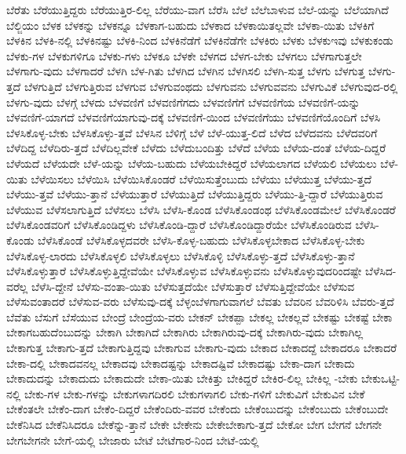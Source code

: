 {ಬೆರೆತು
ಬೆರೆಯುತ್ತಿದ್ದರು
ಬೆರೆಯುತ್ತಿರ-ಲಿಲ್ಲ
ಬೆರೆಯು-ವಾಗ
ಬೆರೆಸಿ
ಬೆಲೆ
ಬೆಲೆಬಾಳುವ
ಬೆಲೆ-ಯನ್ನು
ಬೆಲೆಯಾಗಿದೆ
ಬೆಲ್ಜಿಯಂ
ಬೆಳಕ
ಬೆಳಕನ್ನು
ಬೆಳಕನ್ನೂ
ಬೆಳಕಾಗ-ಬಹುದು
ಬೆಳಕಾದ
ಬೆಳಕಾಯಿತಲ್ಲವೇ
ಬೆಳಕಾ-ಯಿತು
ಬೆಳಕಿಗೆ
ಬೆಳಕಿನ
ಬೆಳಕಿ-ನಲ್ಲಿ
ಬೆಳಕಿನಷ್ಟು
ಬೆಳಕಿ-ನಿಂದ
ಬೆಳಕಿನೆಡೆಗೆ
ಬೆಳಕಿನೆಡೆಗೇ
ಬೆಳಕಿರು
ಬೆಳಕು
ಬೆಳಕುಇವು
ಬೆಳಕುಕಂಡು
ಬೆಳಕು-ಗಳ
ಬೆಳಕುಗಳಿಗೂ
ಬೆಳಕು-ಗಳು
ಬೆಳಕೂ
ಬೆಳಕೇ
ಬೆಳಗದ
ಬೆಳಗ-ಬೇಕು
ಬೆಳಗಲು
ಬೆಳಗಾಗುತ್ತಲೇ
ಬೆಳಗಾಗು-ವುದು
ಬೆಳಗಾದರೆ
ಬೆಳಗಿ
ಬೆಳ-ಗಿತು
ಬೆಳಗಿದ
ಬೆಳಗಿನ
ಬೆಳಗಿಸಲಿ
ಬೆಳಗಿ-ಸುತ್ತ
ಬೆಳಗು
ಬೆಳಗುತ್ತ
ಬೆಳಗು-ತ್ತದೆ
ಬೆಳಗುತ್ತಿದೆ
ಬೆಳಗುತ್ತಿರುವ
ಬೆಳಗುವ
ಬೆಳಗುವಂಥದು
ಬೆಳಗುವನು
ಬೆಳಗುವವನು
ಬೆಳಗುವಿಕೆ
ಬೆಳಗುವುದ-ರಲ್ಲಿ
ಬೆಳಗು-ವುದು
ಬೆಳಗ್ಗೆ
ಬೆಳದು
ಬೆಳವಣಿಗೆ
ಬೆಳವಣಿಗೆಗದು
ಬೆಳವಣಿಗೆಗೆ
ಬೆಳವಣಿಗೆಯ
ಬೆಳವಣಿಗೆ-ಯನ್ನು
ಬೆಳವಣಿಗೆ-ಯಾಗದೆ
ಬೆಳವಣಿಗೆಯಾಗುವು-ದಕ್ಕೆ
ಬೆಳವಣಿಗೆ-ಯಿಂದ
ಬೆಳವಣಿಗೆಯು
ಬೆಳವಣಿಗೆಯೊಂದಿಗೆ
ಬೆಳಸಿ
ಬೆಳಸಿಕೊಳ್ಳ-ಬೇಕು
ಬೆಳಸಿಕೊಳ್ಳು-ತ್ತವೆ
ಬೆಳಸಿನ
ಬೆಳಿಗ್ಗೆ
ಬೆಳೆ
ಬೆಳೆ-ಯುತ್ತ-ಲಿದೆ
ಬೆಳೆದ
ಬೆಳೆದವನು
ಬೆಳೆದವರಿಗೆ
ಬೆಳೆದಿದ್ದ
ಬೆಳೆದಿರು-ತ್ತದೆ
ಬೆಳೆದಿಲ್ಲವೇಕೆ
ಬೆಳೆದು
ಬೆಳೆದುಬಂದಿತ್ತು
ಬೆಳೆದೆ
ಬೆಳೆಯ
ಬೆಳೆಯ-ದಂತೆ
ಬೆಳೆಯ-ದಿದ್ದರೆ
ಬೆಳೆಯದೆ
ಬೆಳೆಯದೇ
ಬೆಳೆ-ಯನ್ನು
ಬೆಳೆಯ-ಬಹುದು
ಬೆಳೆಯಬೇಕಿದ್ದರೆ
ಬೆಳೆಯಲಾಗದ
ಬೆಳೆಯಲಿ
ಬೆಳೆಯಲು
ಬೆಳೆ-ಯಿತು
ಬೆಳೆಯಿಸಲು
ಬೆಳೆಯಿಸಿ
ಬೆಳೆಯಿಸಿಕೊಂಡರೆ
ಬೆಳೆಯಿಸುತ್ತೆಂಬುದು
ಬೆಳೆಯು
ಬೆಳೆಯುತ್ತ
ಬೆಳೆಯು-ತ್ತದೆ
ಬೆಳೆಯು-ತ್ತವೆ
ಬೆಳೆಯು-ತ್ತಾನೆ
ಬೆಳೆಯುತ್ತಾರೆ
ಬೆಳೆಯುತ್ತಿದೆ
ಬೆಳೆಯುತ್ತಿದ್ದರು
ಬೆಳೆಯು-ತ್ತಿ-ದ್ದಾರೆ
ಬೆಳೆಯುತ್ತಿರುವ
ಬೆಳೆಯುವ
ಬೆಳೆಸಲಾಗುತ್ತಿದೆ
ಬೆಳೆಸಲು
ಬೆಳೆಸಿ
ಬೆಳೆಸಿ-ಕೊಂಡ
ಬೆಳೆಸಿಕೊಂಡಂಥ
ಬೆಳೆಸಿಕೊಂಡಮೇಲೆ
ಬೆಳೆಸಿಕೊಂಡರೆ
ಬೆಳೆಸಿಕೊಂಡವರಿಗೆ
ಬೆಳೆಸಿಕೊಂಡಿದ್ದಳು
ಬೆಳೆಸಿಕೊಂಡಿ-ದ್ದಾರೆ
ಬೆಳೆಸಿಕೊಂಡಿದ್ದಾರೆಯೇ
ಬೆಳೆಸಿಕೊಂಡಿರುವ
ಬೆಳೆಸಿ-ಕೊಂಡು
ಬೆಳೆಸಿಕೊಂಡೆ
ಬೆಳೆಸಿಕೊಳ್ಳದವರೇ
ಬೆಳೆಸಿ-ಕೊಳ್ಳ-ಬಹುದು
ಬೆಳೆಸಿಕೊಳ್ಳಬೇಕಾದ
ಬೆಳೆಸಿಕೊಳ್ಳ-ಬೇಕು
ಬೆಳೆಸಿಕೊಳ್ಳ-ಲಾರದು
ಬೆಳೆಸಿಕೊಳ್ಳಲಿ
ಬೆಳೆಸಿಕೊಳ್ಳಲು
ಬೆಳೆಸಿಕೊಳ್ಳಿ
ಬೆಳೆಸಿಕೊಳ್ಳು-ತ್ತದೆ
ಬೆಳೆಸಿಕೊಳ್ಳು-ತ್ತಾನೆ
ಬೆಳೆಸಿಕೊಳ್ಳುತ್ತಾರೆ
ಬೆಳೆಸಿಕೊಳ್ಳುತ್ತಿದ್ದೇವೆಯೇ
ಬೆಳೆಸಿಕೊಳ್ಳುವ
ಬೆಳೆಸಿಕೊಳ್ಳುವನು
ಬೆಳೆಸಿಕೊಳ್ಳುವುದರಿಂದಷ್ಟೇ
ಬೆಳೆಸಿದ-ವರೆಲ್ಲ
ಬೆಳೆಸಿ-ದ್ದೇನೆ
ಬೆಳೆಸು-ವಂತಾ-ಯಿತು
ಬೆಳೆಸುತ್ತದೆಯೇ
ಬೆಳೆಸುತ್ತಾರೆ
ಬೆಳೆಸುತ್ತಿದ್ದೇವೆಯೇ
ಬೆಳೆಸುವ
ಬೆಳೆಸುವಂತಾದರೆ
ಬೆಳೆಸುವ-ವರು
ಬೆಳೆಸುವು-ದಕ್ಕೆ
ಬೆಳ್ಳಂಬೆಳಗಾಗುವಾಗಲೆ
ಬೆವತು
ಬೆವರಿನ
ಬೆವರಿಳಿಸಿ
ಬೆವರು-ತ್ತದೆ
ಬೆವೆತು
ಬೆಸುಗೆ
ಬೆಸೆಯುವ
ಬೇಂದ್ರೆ
ಬೇಂದ್ರೆಯ-ವರು
ಬೇಕನ್
ಬೇಕಪ್ಪಾ
ಬೇಕಲ್ಲ
ಬೇಕಲ್ಲವೆ
ಬೇಕಷ್ಟು
ಬೇಕಷ್ಟೆ
ಬೇಕಾ
ಬೇಕಾಗಬಹುದೆಂಬುದನ್ನು
ಬೇಕಾಗಿ
ಬೇಕಾಗಿದೆ
ಬೇಕಾಗಿರು
ಬೇಕಾಗಿರುವು-ದಕ್ಕೆ
ಬೇಕಾಗಿರು-ವುದು
ಬೇಕಾಗಿಲ್ಲ
ಬೇಕಾಗುತ್ತ
ಬೇಕಾಗು-ತ್ತದೆ
ಬೇಕಾಗುತ್ತಿದ್ದವು
ಬೇಕಾಗುವ
ಬೇಕಾಗು-ವುದು
ಬೇಕಾದ
ಬೇಕಾದದ್ದೆ
ಬೇಕಾದರೂ
ಬೇಕಾದರೆ
ಬೇಕಾ-ದಲ್ಲಿ
ಬೇಕಾದವನಲ್ಲ
ಬೇಕಾದವು
ಬೇಕಾದಷ್ಟನ್ನು
ಬೇಕಾದಷ್ಟಿವೆ
ಬೇಕಾದಷ್ಟು
ಬೇಕಾ-ದಾಗ
ಬೇಕಾದು
ಬೇಕಾದುದನ್ನು
ಬೇಕಾದುದು
ಬೇಕಾದುದೇ
ಬೇಕಾ-ಯಿತು
ಬೇಕಿತ್ತು
ಬೇಕಿದ್ದರೆ
ಬೇಕಿರ-ಲಿಲ್ಲ
ಬೇಕಿಲ್ಲ
-ಬೇಕು
ಬೇಕುಒಟ್ಟಿ-ನಲ್ಲಿ
ಬೇಕು-ಗಳ
ಬೇಕು-ಗಳನ್ನು
ಬೇಕುಗಳಾಗದಿರಲಿ
ಬೇಕುಗಳಾಗಲಿ
ಬೇಕು-ಗಳಿಗೆ
ಬೇಕುವಿಗೆ
ಬೇಕುವಿನ
ಬೇಕೆ
ಬೇಕೆಂತಲೇ
ಬೇಕೆಂ-ದಾಗ
ಬೇಕೆಂ-ದಿದ್ದರೆ
ಬೇಕೆಂದಿರು-ವವರ
ಬೇಕೆಂದು
ಬೇಕೆಂಬುದನ್ನು
ಬೇಕೆಂಬುದು
ಬೇಕೆಂಬುದೇ
ಬೇಕೆನಿಸಿದ
ಬೇಕೆನಿಸಿದರೂ
ಬೇಕೆನ್ನು-ತ್ತಾನೆ
ಬೇಕೇ
ಬೇಕೇನು
ಬೇಕೇಬೇಕಾಗು-ತ್ತದೆ
ಬೇಕೋ
ಬೇಗ
ಬೇಗನೆ
ಬೇಗನೇ
ಬೇಗಬೇಗನೇ
ಬೇಗೆ-ಯಲ್ಲಿ
ಬೇಜಾರು
ಬೇಟೆ
ಬೇಟೆಗಾರ-ನಿಂದ
ಬೇಟೆ-ಯಲ್ಲಿ
}
